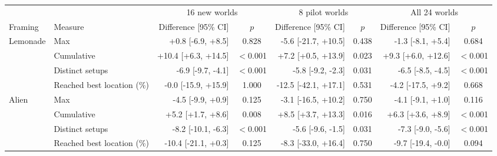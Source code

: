 \begin{tabular}{l l rc rc rc}
\toprule
 & & \multicolumn{2}{c}{16 new worlds} & \multicolumn{2}{c}{8 pilot worlds} & \multicolumn{2}{c}{All 24 worlds} \\
\cmidrule(lr){3-4} \cmidrule(lr){5-6} \cmidrule(lr){7-8}
Framing & Measure & Difference [95\% CI] & $p$ & Difference [95\% CI] & $p$ & Difference [95\% CI] & $p$ \\
\midrule
Lemonade & Max & +0.8 [-6.9, +8.5] & 0.828 & -5.6 [-21.7, +10.5] & 0.438 & -1.3 [-8.1, +5.4] & 0.684 \\
 & Cumulative & +10.4 [+6.3, +14.5] & $<$0.001 & +7.2 [+0.5, +13.9] & 0.023 & +9.3 [+6.0, +12.6] & $<$0.001 \\
 & Distinct setups & -6.9 [-9.7, -4.1] & $<$0.001 & -5.8 [-9.2, -2.3] & 0.031 & -6.5 [-8.5, -4.5] & $<$0.001 \\
 & Reached best location (\%) & -0.0 [-15.9, +15.9] & 1.000 & -12.5 [-42.1, +17.1] & 0.531 & -4.2 [-17.5, +9.2] & 0.668 \\
\addlinespace
Alien & Max & -4.5 [-9.9, +0.9] & 0.125 & -3.1 [-16.5, +10.2] & 0.750 & -4.1 [-9.1, +1.0] & 0.116 \\
 & Cumulative & +5.2 [+1.7, +8.6] & 0.008 & +8.5 [+3.7, +13.3] & 0.016 & +6.3 [+3.6, +8.9] & $<$0.001 \\
 & Distinct setups & -8.2 [-10.1, -6.3] & $<$0.001 & -5.6 [-9.6, -1.5] & 0.031 & -7.3 [-9.0, -5.6] & $<$0.001 \\
 & Reached best location (\%) & -10.4 [-21.1, +0.3] & 0.125 & -8.3 [-33.0, +16.4] & 0.750 & -9.7 [-19.4, -0.0] & 0.094 \\
\bottomrule
\end{tabular}